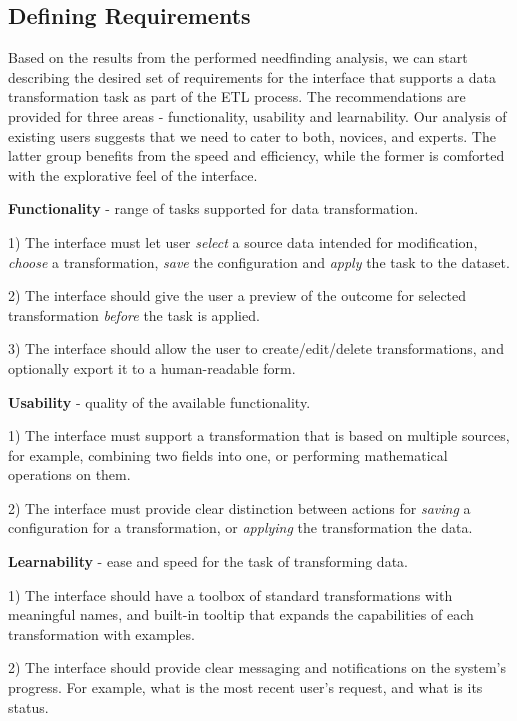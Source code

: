 \documentclass[12pt,letterpaper]{article}
\begin{document}
\appendix

\subsection*{Defining Requirements}

Based on the results from the performed needfinding analysis, we can start describing the desired set of requirements for the interface that supports a data transformation task as part of the ETL process. The recommendations are provided for three areas - functionality, usability and learnability. Our analysis of existing users suggests that we need to cater to both, novices, and experts. The latter group benefits from the speed and efficiency, while the former is comforted with the explorative feel of the interface.

\bigskip
\textbf{Functionality} - range of tasks supported for data transformation.

1) The interface must let user \textit{select} a source data intended for modification, \textit{choose} a transformation, \textit{save} the configuration and \textit{apply} the task to the dataset.

2) The interface should give the user a preview of the outcome for selected transformation \textit{before} the task is applied.

3) The interface should allow the user to create/edit/delete transformations, and optionally export it to a human-readable form.

\textbf{Usability} - quality of the available functionality.

1) The interface must support a transformation that is based on multiple sources, for example, combining two fields into one, or performing mathematical operations on them.

2) The interface must provide clear distinction between actions for \textit{saving} a configuration for a transformation, or \textit{applying} the transformation the data.

\textbf{Learnability} - ease and speed for the task of transforming data.

1) The interface should have a toolbox of standard transformations with meaningful names, and built-in tooltip that expands the capabilities of each transformation with examples.

2) The interface should provide clear messaging and notifications on the system's progress. For example, what is the most recent user's request, and what is its status.
\end{document}
